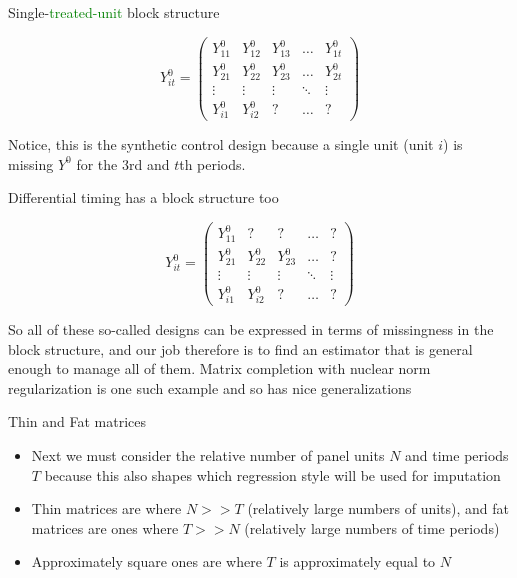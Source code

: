 \documentclass{beamer}
\begin{document}
\begin{frame}{Single-\textcolor{green}{treated-unit} block structure}

\begin{center}
\[ Y^0_{it}  =\begin{pmatrix}
    Y^0_{11} & Y^0_{12} & Y^0_{13} & \dots  & Y^0_{1t} \\
    Y^0_{21} & Y^0_{22} & Y^0_{23} & \dots  & Y^0_{2t}  \\
    \vdots & \vdots & \vdots & \ddots & \vdots \\
    Y^0_{i1} & Y^0_{i2} & ? & \dots  & ?
\end{pmatrix}\]
\end{center}

Notice, this is the synthetic control design because a single unit (unit $i$) is missing $Y^0$ for the 3rd and $t$th periods.

\end{frame}

\begin{frame}{Differential timing has a block structure too}

\begin{center}
\[ Y^0_{it}  =\begin{pmatrix}
    Y^0_{11} & ? & ? & \dots  & ? \\
    Y^0_{21} & Y^0_{22} & Y^0_{23} & \dots  & ? \\
    \vdots & \vdots & \vdots & \ddots & \vdots \\
    Y^0_{i1} & Y^0_{i2} & ? & \dots  & ?
\end{pmatrix}\]
\end{center}

So all of these so-called designs can be expressed in terms of missingness in the block structure, and our job therefore is to find an estimator that is general enough to manage all of them.  Matrix completion with nuclear norm regularization is one such example and so has nice generalizations

\end{frame}


\begin{frame}{Thin and Fat matrices}

\begin{itemize}
\item Next we must consider the relative number of panel units $N$ and time periods $T$ because this also shapes which regression style will be used for imputation
\item Thin matrices are where $N>>T$ (relatively large numbers of units), and fat matrices are ones where $T>>N$ (relatively large numbers of time periods)
\item Approximately square ones are where $T$ is approximately equal to $N$
\end{itemize}

\end{frame}
\end{document}
